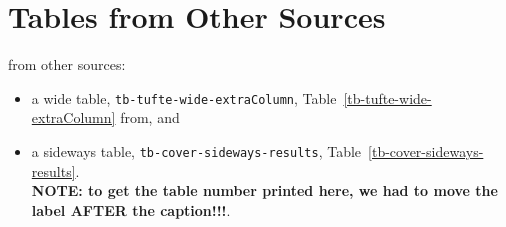 %

\clearpage
\section{Tables from Other Sources}
\label{chap-Tables-Other}

  from other sources:
\lipsum[4]
\begin{itemize}
\item
a wide table, {\tt tb-tufte-wide-extraColumn}, Table~\ref{tb-tufte-wide-extraColumn}
from\cite[2ex]{Lib-OPUS2-ebook-xBed-2015-Brglez,Lib-OPUS2-labs-2015-arxiv-Boskovic}, and
\item
a sideways table, {\tt tb-cover-sideways-results}, Table~\ref{tb-cover-sideways-results}.\\{\bf NOTE: to get the table number printed here, we had to move
the label AFTER the caption!!!}.
\end{itemize}
\lipsum[4]



 